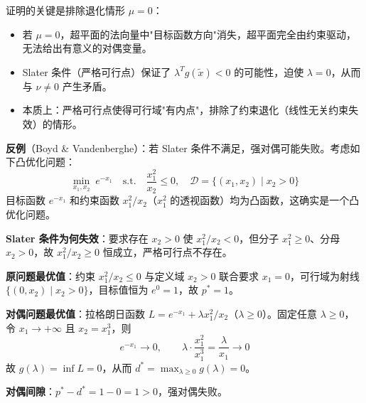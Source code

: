 \documentclass[12pt, a4paper]{ctexart}
\begin{document}
\begin{insight}

证明的关键是排除退化情形 $\mu = 0$：
\begin{itemize}
    \item 若 $\mu = 0$，超平面的法向量中"目标函数方向"消失，超平面完全由约束驱动，无法给出有意义的对偶变量。
    \item Slater 条件（严格可行点）保证了 $\lambda^T g(\tilde{x}) < 0$ 的可能性，迫使 $\lambda = 0$，从而与 $\nu \neq 0$ 产生矛盾。
    \item 本质上：严格可行点使得可行域"有内点"，排除了约束退化（线性无关约束失效）的情形。
\end{itemize}

\textbf{反例}（Boyd \& Vandenberghe）：若 Slater 条件不满足，强对偶可能失败。考虑如下凸优化问题：
\[
\min_{x_1, x_2} \; e^{-x_1} \quad \text{s.t.} \quad \frac{x_1^2}{x_2} \leq 0, \quad \mathcal{D} = \{(x_1, x_2) \mid x_2 > 0\}
\]
目标函数 $e^{-x_1}$ 和约束函数 $x_1^2/x_2$（$x_1^2$ 的透视函数）均为凸函数，这确实是一个凸优化问题。

\textbf{Slater 条件为何失效}：要求存在 $x_2 > 0$ 使 $x_1^2/x_2 < 0$，但分子 $x_1^2 \geq 0$、分母 $x_2 > 0$，故 $x_1^2/x_2 \geq 0$ 恒成立，严格可行点不存在。

\textbf{原问题最优值}：约束 $x_1^2/x_2 \leq 0$ 与定义域 $x_2 > 0$ 联合要求 $x_1 = 0$，可行域为射线 $\{(0, x_2) \mid x_2 > 0\}$，目标值恒为 $e^0 = 1$，故 $p^* = 1$。

\textbf{对偶问题最优值}：拉格朗日函数 $L = e^{-x_1} + \lambda x_1^2/x_2$（$\lambda \geq 0$）。固定任意 $\lambda \geq 0$，令 $x_1 \to +\infty$ 且 $x_2 = x_1^3$，则
\[
e^{-x_1} \to 0, \qquad \lambda \cdot \frac{x_1^2}{x_1^3} = \frac{\lambda}{x_1} \to 0
\]
故 $g(\lambda) = \inf L = 0$，从而 $d^* = \max_{\lambda \geq 0} g(\lambda) = 0$。

\textbf{对偶间隙}：$p^* - d^* = 1 - 0 = 1 > 0$，强对偶失败。

\end{insight}
\end{document}
